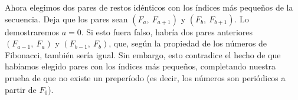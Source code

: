 Ahora elegimos dos pares de restos idénticos con los índices más pequeños de la secuencia. Deja que los pares sean $(F_a,\ F_{a + 1})$ y $(F_b,\ F_{b + 1})$. Lo demostraremos $a = 0$. Si esto fuera falso, habría dos pares anteriores $(F_{a-1},\ F_a)$ y $(F_{b-1},\ F_b)$, que, según la propiedad de los números de Fibonacci, también sería igual. Sin embargo, esto contradice el hecho de que habíamos elegido pares con los índices más pequeños, completando nuestra prueba de que no existe un preperíodo (es decir, los números son periódicos a partir de $F_0$).